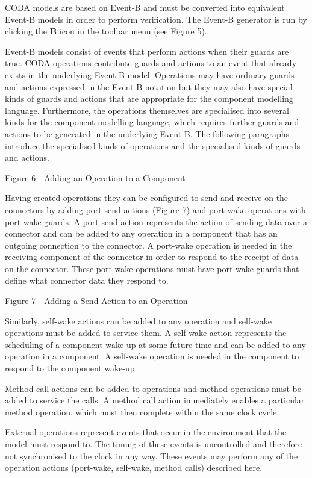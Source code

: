 CODA models are based on Event-B and must be converted into equivalent Event-B models in order to perform verification. The Event-B generator is run by clicking the \textbf{B} icon in the toolbar menu (see Figure 5).


Event-B models consist of events that perform actions when their guards are true. CODA operations contribute guards and actions to an event that already exists in the underlying Event-B model. Operations may have ordinary guards and actions expressed in the Event-B notation but they may also have special kinds of guards and actions that are appropriate for the component modelling language. Furthermore, the operations themselves are specialised into several kinds for the component modelling language, which requires further guards and actions to be generated in the underlying Event-B. The following paragraphs introduce the specialised kinds of operations and the specialised kinds of guards and actions.
 
Figure 6 - Adding an Operation to a Component


Having created operations they can be configured to send and receive on the connectors by adding port-send actions (Figure 7) and port-wake operations with port-wake guards. A port-send action represents the action of sending data over a connector and can be added to any operation in a component that has an outgoing connection to the connector. A port-wake operation is needed in the receiving component of the connector in order to respond to the receipt of data on the connector. These port-wake operations must have port-wake guards that define what connector data they respond to. 

 
Figure 7 - Adding a Send Action to an Operation
 
 
Similarly, self-wake actions can be added to any operation and self-wake operations must be added to service them. A self-wake action represents the scheduling of a component wake-up at some future time and can be added to any operation in a component. A self-wake operation is needed in the component to respond to the component wake-up. 


Method call actions can be added to operations and method operations must be added to service the calls. A method call action immediately enables a particular method operation, which must then complete within the same clock cycle.


External operations represent events that occur in the environment that the model must respond to. The timing of these events is uncontrolled and therefore not synchronised to the clock in any way. These events may perform any of the operation actions (port-wake, self-wake, method calls) described here.



